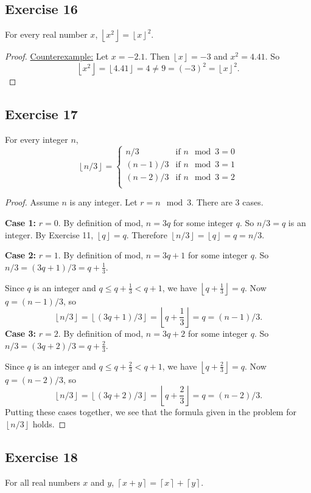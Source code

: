 \documentclass[14pt]{extarticle}
\newcommand{\floor}[1]{{\left\lfloor#1\right\rfloor}}
\newcommand{\ceil}[1]{{\left\lceil#1\right\rceil}}
\begin{document}
\subsection{Exercise 16}
For every real number $x$, $\floor{x^2} = \floor{x}^2$.

\begin{proof}
\underline{Counterexample:} Let $x = -2.1$. Then $\floor{x} = -3$ and $x^2 = 4.41$. So 
\[
\floor{x^2} = \floor{4.41} = 4 \neq 9 = (-3)^2 = \floor{x}^2.
\]
\end{proof}

\subsection{Exercise 17}
For every integer $n$,
\[
\floor{n/3} =
\left\{
\begin{array}{lr}
n/3 & \text{if } n \mod 3 = 0\\
(n-1)/3 & \text{if } n \mod 3 = 1\\
(n-2)/3 & \text{if } n \mod 3 = 2\\
\end{array}
\right.
\]
\begin{proof}
Assume $n$ is any integer. Let $r = n \mod 3$. There are 3 cases.

{\bf Case 1:} $r = 0$. By definition of mod, $n = 3q$ for some integer $q$. So $n/3 = q$ is an integer. By Exercise 11, $\floor{q} = q$. Therefore $\floor{n/3} = \floor{q} = q = n / 3$.

{\bf Case 2:} $r = 1$. By definition of mod, $n = 3q + 1$ for some integer $q$. So $n/3 = (3q+1)/3 = q + \frac{1}{3}$. 

Since $q$ is an integer and $q \leq q + \frac{1}{3} < q+1$, we have $\floor{q+\frac{1}{3}} = q$. Now $q = (n-1)/3$, so 
\[
\floor{n/3} = \floor{(3q+1)/3} = \floor{q+\frac{1}{3}} = q = (n-1)/3.
\]
{\bf Case 3:} $r = 2$. By definition of mod, $n = 3q + 2$ for some integer $q$. So $n/3 = (3q+2)/3 = q + \frac{2}{3}$. 

Since $q$ is an integer and $q \leq q + \frac{2}{3} < q+1$, we have $\floor{q+\frac{2}{3}} = q$. Now $q = (n-2)/3$, so 
\[
\floor{n/3} = \floor{(3q+2)/3} = \floor{q+\frac{2}{3}} = q = (n-2)/3.
\]
Putting these cases together, we see that the formula given in the problem for $\floor{n/3}$ holds.
\end{proof}

\subsection{Exercise 18}
For all real numbers $x$ and $y$, $\ceil{x + y} = \ceil{x} + \ceil{y}$.
\end{document}
